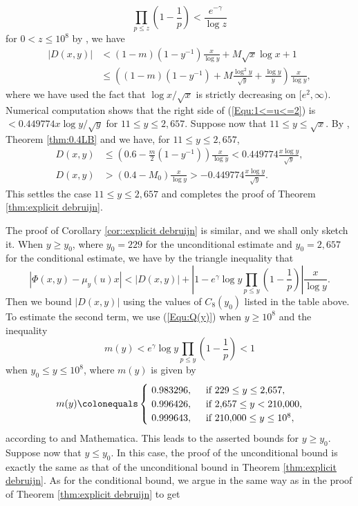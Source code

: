 \documentclass[12pt,reqno]{amsart}
\begin{document}
\[\prod_{p\leq z}\left(1-\frac{1}{p}\right)<\frac{e^{-\gamma}}{\log z}\]
for $0<z\le10^{8}$ by \cite[Theorem 23]{RS}, we have
\begin{align}
|D(x,y)|&<(1-m)\left(1-y^{-1}\right)\frac{x}{\log y}+M\sqrt{x}\log x+1\nonumber\\
&\le\left((1-m)\left(1-y^{-1}\right)+M\frac{\log^2y}{\sqrt{y}}+\frac{\log y}{y}\right)\frac{x}{\log y},\label{Equ:1<=u<=2}
\end{align}
where we have used the fact that $\log x/\sqrt{x}$ is strictly decreasing on $[e^2,\infty)$. Numerical computation shows that the right side of (\ref{Equ:1<=u<=2}) is $<0.449774x\log y/\sqrt{y}$ for $11\le y\le 2{,}657$. Suppose now that $11\le y\le\sqrt{x}$. By \cite[Theorem 1]{FP}, Theorem \ref{thm:0.4LB} and \cite[Theorem 23]{RS} we have, for $11\le y\le2{,}657$,
\begin{align*}
D(x,y)&\le\left(0.6-\frac{m}{2}\left(1-y^{-1}\right)\right)\frac{x}{\log y}<0.449774\frac{x\log y}{\sqrt{y}},\\
D(x,y)&>(0.4-M_0)\frac{x}{\log y}>-0.449774\frac{x\log y}{\sqrt{y}}.
\end{align*}
This settles the case $11\le y\le 2{,}657$ and completes the proof of Theorem \ref{thm:explicit debruijn}.
\par The proof of Corollary \ref{cor::explicit debruijn} is similar, and we shall only sketch it. When $y\ge y_0$, where $y_0=229$ for the unconditional estimate and $y_0=2{,}657$ for the conditional estimate, we have by the triangle inequality that
\[|\Phi(x,y)-\mu_y(u)x|< |D(x,y)|+\left|1-e^{\gamma}\log y\prod_{p\leq y}\left(1-\frac{1}{p}\right)\right|\frac{x}{\log y}.\]
Then we bound $|D(x,y)|$ using the values of $C_8(y_0)$ listed in the table above. To estimate the second term, we use (\ref{Equ:Q(y)}) when $y\ge 10^8$ and the inequality 
\[m(y)<e^{\gamma}\log y\prod_{p\leq y}\left(1-\frac{1}{p}\right)<1\]
when $y_0\le y\le 10^8$, where $m(y)$ is given by
\[m(y)\colonequals\begin{cases}
	~0.983296,& \text{\hspace*{2mm}if~}229\le y\le 2{,}657,\\
	~0.996426,&\text{\hspace*{2mm}if~}2{,}657\le y<210{,}000,\\
	~0.999643,&\text{\hspace*{2mm}if~}210{,}000\le y\le10^8,
\end{cases}\]
according to \cite[Theorem 23]{RS} and Mathematica. This leads to the asserted bounds for $y\ge y_0$. Suppose now that $y\le y_0$. In this case, the proof of the unconditional bound is exactly the same as that of the unconditional bound in Theorem \ref{thm:explicit debruijn}. As for the conditional bound, we argue in the same way as in the proof of Theorem \ref{thm:explicit debruijn} to get
\end{document}
